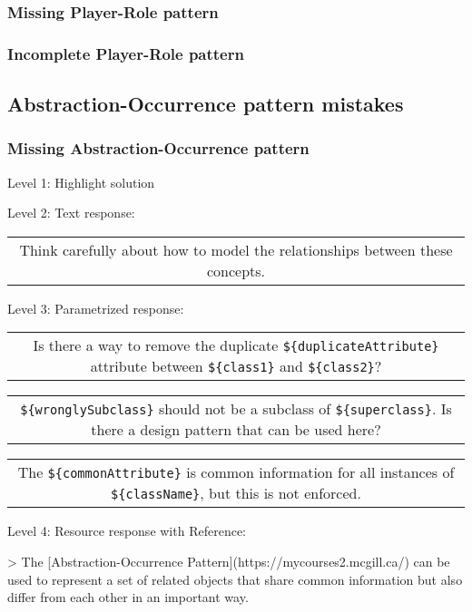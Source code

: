 \subsubsection{Missing Player-Role pattern}


\subsubsection{Incomplete Player-Role pattern}


\subsection{Abstraction-Occurrence pattern mistakes}

\subsubsection{Missing Abstraction-Occurrence pattern}

\noindent Level 1: Highlight solution \medskip

\noindent Level 2: Text response: \medskip

\begin{tabular}{|c}
Think carefully about how to model the relationships between these concepts.
\end{tabular} \medskip

\noindent Level 3: Parametrized response: \medskip

\begin{tabular}{|c}
Is there a way to remove the duplicate \verb|${duplicateAttribute}| attribute between \verb|${class1}| and \verb|${class2}|?
\end{tabular} \medskip

\begin{tabular}{|c}
\verb|${wronglySubclass}| should not be a subclass of \verb|${superclass}|. Is there a design pattern that can be used here?
\end{tabular} \medskip

\begin{tabular}{|c}
The \verb|${commonAttribute}| is common information for all instances of \verb|${className}|, but this is not enforced.
\end{tabular} \medskip

\noindent Level 4: Resource response with Reference:

> The [Abstraction-Occurrence Pattern](https://mycourses2.mcgill.ca/) can be used to 
represent a set of related objects that share common information but also differ
from each other in an important way.

